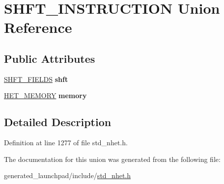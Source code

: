 \hypertarget{unionSHFT__INSTRUCTION}{}\section{S\+H\+F\+T\+\_\+\+I\+N\+S\+T\+R\+U\+C\+T\+I\+ON Union Reference}
\label{unionSHFT__INSTRUCTION}
\subsection*{Public Attributes}
\begin{DoxyCompactItemize}
\item 
\mbox{\label{unionSHFT__INSTRUCTION_a5a1ac4c076a066afeb192bfe0e7a7e97}} 
\mbox{\hyperlink{structshft__format}{S\+H\+F\+T\+\_\+\+F\+I\+E\+L\+DS}} {\bfseries shft}
\item 
\mbox{\label{unionSHFT__INSTRUCTION_a470e8934caaeb831f0a033c51830a1f2}} 
\mbox{\hyperlink{structmemory__format}{H\+E\+T\+\_\+\+M\+E\+M\+O\+RY}} {\bfseries memory}
\end{DoxyCompactItemize}


\subsection{Detailed Description}


Definition at line 1277 of file std\+\_\+nhet.\+h.



The documentation for this union was generated from the following file\+:\begin{DoxyCompactItemize}
\item 
generated\+\_\+launchpad/include/\mbox{\hyperlink{std__nhet_8h}{std\+\_\+nhet.\+h}}\end{DoxyCompactItemize}
